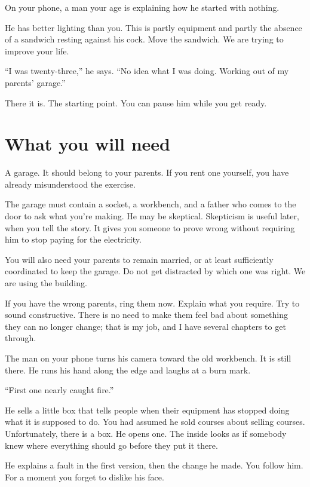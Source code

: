 \documentclass[11pt,oneside]{book}
\begin{document}
On your phone, a man your age is explaining how he started with nothing.

He has better lighting than you. This is partly equipment and partly the absence of a sandwich resting against his cock. Move the sandwich. We are trying to improve your life.

``I was twenty-three,'' he says. ``No idea what I was doing. Working out of my parents' garage.''

There it is. The starting point. You can pause him while you get ready.

\section*{What you will need}

A garage. It should belong to your parents. If you rent one yourself, you have already misunderstood the exercise.

The garage must contain a socket, a workbench, and a father who comes to the door to ask what you're making. He may be skeptical. Skepticism is useful later, when you tell the story. It gives you someone to prove wrong without requiring him to stop paying for the electricity.

You will also need your parents to remain married, or at least sufficiently coordinated to keep the garage. Do not get distracted by which one was right. We are using the building.

If you have the wrong parents, ring them now. Explain what you require. Try to sound constructive. There is no need to make them feel bad about something they can no longer change; that is my job, and I have several chapters to get through.

The man on your phone turns his camera toward the old workbench. It is still there. He runs his hand along the edge and laughs at a burn mark.

``First one nearly caught fire.''

He sells a little box that tells people when their equipment has stopped doing what it is supposed to do. You had assumed he sold courses about selling courses. Unfortunately, there is a box. He opens one. The inside looks as if somebody knew where everything should go before they put it there.

He explains a fault in the first version, then the change he made. You follow him. For a moment you forget to dislike his face.
\end{document}
